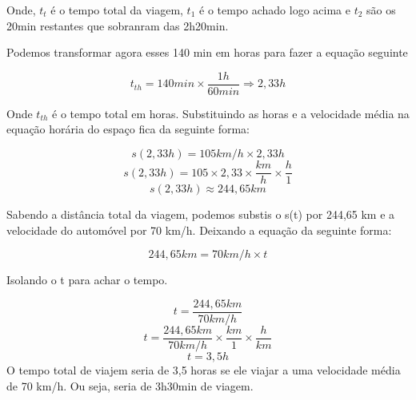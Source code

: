 \documentclass[a4paper, 12pt]{article}
\begin{document}
\begin{flushleft}
		
		Onde, $t_t$ é o tempo total da viagem, $t_1$ é o tempo achado logo acima e $t_2$ são os 20min restantes que sobranram das 2h20min. 
		
		Podemos transformar agora esses 140 min em horas para fazer a equação seguinte
		
		\begin{equation*}
			t_{th}= 140 min \times \frac{1h}{60 min} \Rightarrow 2,33 h 
		\end{equation*}
		
		Onde $t_{th}$ é o tempo total em horas. Substituindo as horas e a velocidade média na equação horária do espaço fica da seguinte forma:
		
		\begin{equation*}
			s(2,33h) =105 km/h \times 2,33h
		\end{equation*}
		\begin{equation*}
			s(2,33h) =105 \times 2,33 \times \frac{km}{h} \times \frac{h}{1}
		\end{equation*}
		\begin{equation*}
			s(2,33h) \approx 244,65 km
		\end{equation*}
		
		Sabendo a distância total da viagem, podemos substis o s(t) por 244,65 km e a velocidade do automóvel por 70 km/h. Deixando a equação da seguinte forma:
		
		\begin{equation*}
			244,65 km = 70 km/h\times t 
		\end{equation*}
		
		Isolando o t para achar o tempo.
		
		\begin{equation*}
			t = \frac{244,65 km}{70 km/h} 
		\end{equation*}
		\begin{equation*}
			t = \frac{244,65 km}{70 km/h} \times \frac{km}{1} \times \frac{h}{km} 
		\end{equation*}
		\begin{equation*}
			t = 3,5h 
		\end{equation*}
		O tempo total de viajem seria de 3,5 horas se ele viajar a uma velocidade média de 70 km/h. Ou seja, seria de 3h30min de viagem.
		
	\end{flushleft}
	
	
\end{document}
